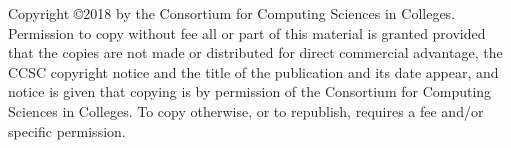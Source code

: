 Copyright \copyright 2018 by the Consortium for Computing Sciences in Colleges.
Permission to copy without fee all or part of this material is granted provided
that the copies are not made or distributed for direct commercial advantage,
the CCSC copyright notice and the title of the publication and its date appear,
and notice is given that copying is by permission of the Consortium for
Computing Sciences in Colleges.  To copy otherwise, or to republish, requires
a fee and/or specific permission.
